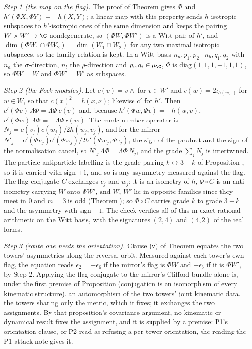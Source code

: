 \emph{Step 1 (the map on the flag).} The proof of Theorem  gives $\Phi$ and $h'(\Phi X, \Phi Y) = -h(X, Y)$; a linear map with this property sends $h$-isotropic subspaces to $h'$-isotropic ones of the same dimension and keeps the pairing $W \times W' \to \C$ nondegenerate, so $(\Phi W, \Phi W')$ is a Witt pair of $h'$, and $\dim(\Phi W_{1} \cap \Phi W_{2}) = \dim(W_{1} \cap W_{2})$ for any two maximal isotropic subspaces, so the family relation is kept. In a Witt basis $n_{a}, p_{1}, p_{2} \mid n_{b}, q_{1}, q_{2}$ with $n_{a}$ the $\sigma$-direction, $n_{b}$ the $\rho$-direction and $p_{i}, q_{i} \in \mu_{\C}$, $\Phi$ is $\mathrm{diag}(1,1,1,-1,1,1)$, so $\Phi W = W$ and $\Phi W' = W'$ as subspaces.

\emph{Step 2 (the Fock modules).} Let $c(v) = v \wedge$ for $v \in W'$ and $c(w) = 2\iota_{h(w, \cdot)}$ for $w \in W$, so that $c(x)^{2} = h(x,x)$; likewise $c'$ for $h'$. Then $c'(\Phi v)\,\Lambda\Phi = \Lambda\Phi\,c(v)$ and, because $h'(\Phi w, \Phi v) = -h(w, v)$, $c'(\Phi w)\,\Lambda\Phi = -\Lambda\Phi\,c(w)$. The mode number operator is $N_{j} = c(v_{j})c(w_{j})/2h(w_{j}, v_{j})$, and for the mirror $N'_{j} = c'(\Phi v_{j})c'(\Phi w_{j})/2h'(\Phi w_{j}, \Phi v_{j})$; the sign of the product and the sign of the normalisation cancel, so $N'_{j}\,\Lambda\Phi = \Lambda\Phi\,N_{j}$, and the grade $\sum_{j} N_{j}$ is intertwined. The particle-antiparticle labelling is the grade pairing $k \leftrightarrow 3 - k$ of Proposition , so it is carried with sign $+1$, and so is any asymmetry measured against the flag. The flag conjugate $C$ exchanges $v_{j}$ and $w_{j}$; it is an isometry of $h$, $\Phi \circ C$ is an anti-isometry carrying $W$ onto $\Phi W'$, and $W$, $W'$ lie in opposite families since they meet in $0$ and $m = 3$ is odd (Theorem ); so $\Phi \circ C$ carries grade $k$ to grade $3 - k$ and the asymmetry with sign $-1$. The check verifies all of this in exact rational arithmetic on the Witt basis, with the signatures $(2,4)$ and $(4,2)$ of the real forms.

\emph{Step 3 (route one needs the orientation).} Clause (v) of Theorem  equates the two towers' asymmetries along the reversal orbit. Measured against each tower's own flag, the equation reads $\epsilon_{2} = +\epsilon_{6}$ if the mirror's flag is $\Phi W$ and $-\epsilon_{6}$ if it is $\Phi W'$, by Step 2. Applying the flag conjugate to the mirror's Clifford bundle alone is, under the first premise of Proposition  (conjugation is an isomorphism of every kinematic structure), an automorphism of the two towers' joint kinematic data, the towers sharing only the metric, which it fixes; it exchanges the two assignments. By that proposition's covariance argument, no kinematic or dynamical result fixes the assignment, and it is supplied by a premise: P1's orientation clause, or P2 read as refusing a per-tower orientation, the reading the P1 attack note gives it.

